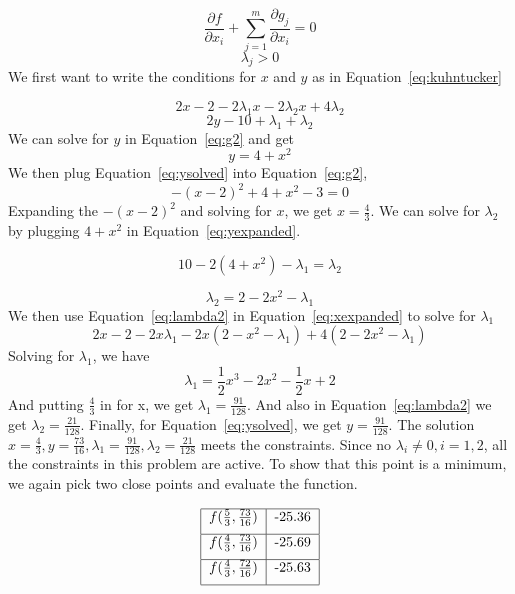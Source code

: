 \documentclass[11pt]{scrartcl}
\begin{document}
\begin{equation}
	\label{eq:kuhntucker}
	\frac{\partial f}{\partial x_i} + \sum_{j=1}^{m}\frac{\partial g_j}{\partial x_i} = 0
\end{equation}
\begin{equation}
	\label{eq:kuhntucker2}
	\lambda_j > 0
\end{equation}
We first want to write the conditions for $x$ and $y$ as in 
Equation~\ref{eq:kuhntucker}

\begin{equation}
	\label{eq:xexpanded}
	2x -2 -2\lambda_1 x - 2\lambda_2 x + 4\lambda_2
\end{equation}
\begin{equation}
	\label{eq:yexpanded}
	2y -10 + \lambda_1 + \lambda_2
\end{equation}
We can solve for $y$ in Equation~\ref{eq:g2}
and get 
\begin{equation}
	\label{eq:ysolved}
	y = 4 + x^2
\end{equation}
We then plug Equation~\ref{eq:ysolved} into Equation~\ref{eq:g2},
\[-(x-2)^2 + 4 + x^2 -3 = 0\]
Expanding the $-(x-2)^2$ and solving for $x$, we get $x=\frac{4}{3}$.
We can solve for $\lambda_2$ by plugging $4+x^2$ in Equation~\ref{eq:yexpanded}.

\[10 - 2(4+x^2) - \lambda_1 = \lambda_2\]

\begin{equation}
	\label{eq:lambda2}
	\lambda_2 = 2 - 2x^2 -\lambda_1
\end{equation}
We then use Equation~\ref{eq:lambda2} in Equation~\ref{eq:xexpanded} to solve
for $\lambda_1$
\[2x - 2 -2x\lambda_1 - 2x(2-x^2-\lambda_1) +4(2-2x^2 -\lambda_1)\]
Solving for $\lambda_1$, we have 
\begin{equation}
	\label{eq:lambda1}
	\lambda_1 = \frac{1}{2}x^3 -2x^2 -\frac{1}{2}x + 2
\end{equation}
And putting $\frac{4}{3}$ in for x, we get $\lambda_1 = \frac{91}{128}$.
And also in Equation~\ref{eq:lambda2} we get $\lambda_2 = \frac{21}{128}$.
Finally, for Equation~\ref{eq:ysolved}, we get $y=\frac{91}{128}$.
The solution $x=\frac{4}{3}, y=\frac{73}{16}, \lambda_1 = \frac{91}{128},
\lambda_2 = \frac{21}{128}$ meets the constraints.
Since no $\lambda_i \neq0, i=1, 2$, all the constraints in this problem are active.
To show that this point is a minimum, we again pick two close points and
evaluate the function.

\[
\begin{tabular}{|c|c|}
	\hline 
	$f(\frac{5}{3}, \frac{73}{16})$ & -25.36 \\ [.2cm]
	\hline 
	$f(\frac{4}{3}, \frac{73}{16})$ & -25.69 \\ [.2cm]
	\hline 
	$f(\frac{4}{3}, \frac{72}{16})$ & -25.63 \\ [.2cm]
	\hline
\end{tabular}
\]
\end{document}
